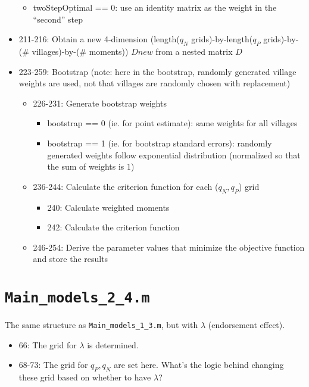 \documentclass[10pt,letterpaper]{article}
\begin{document}
\begin{itemize}
\begin{itemize}
      \item twoStepOptimal == 0: use an identity matrix as the weight in the ``second'' step
    \end{itemize}
  \item 211-216: Obtain a new 4-dimension (length($q_N$ grids)-by-length($q_P$ grids)-by-(\# villages)-by-(\# moments))   $Dnew$ from a nested matrix $D$
  \item 223-259: Bootstrap (note: here in the bootstrap, randomly generated village weights are used, not that villages are randomly chosen with replacement)
    \begin{itemize}
      \item 226-231: Generate bootstrap weights 
        \begin{itemize}
          \item bootstrap == 0 (ie. for point estimate): same weights for all villages
          \item bootstrap == 1 (ie. for bootstrap standard errors): randomly generated weights follow exponential distribution (normalized so that the sum of weights is $1$)
        \end{itemize}
      \item 236-244: Calculate the criterion function for each ($q_N, q_P$) grid
        \begin{itemize}
          \item 240: Calculate weighted moments 
          \item 242: Calculate the criterion function
        \end{itemize}
      \item 246-254: Derive the parameter values that minimize the objective function and store the results
    \end{itemize}
\end{itemize}

\section{\texttt{Main\_models\_2\_4.m}}\label{main_models_2_4}

The same structure as \texttt{Main\_models\_1\_3.m}, but with $\lambda$ (endorsement effect). 

\begin{itemize}
	\item 66: The grid for $\lambda$ is determined. 
	\item 68-73: The grid for $q_P, q_N$ are set here. What's the logic behind changing these grid based on whether to have $\lambda$?
\end{itemize}
\end{document}

